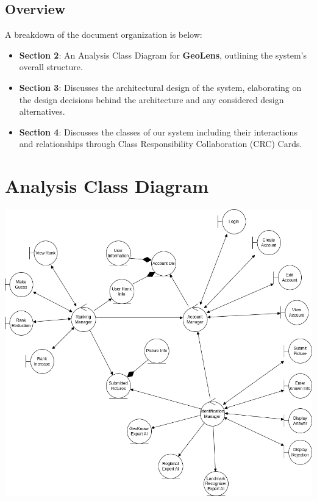 \documentclass[]{article}
\begin{document}
\subsection{Overview}
\label{sub:overview}
A breakdown of the document organization is below:
\begin{itemize}
  \item \textbf{Section 2}: An Analysis Class Diagram for \textbf{GeoLens}, outlining the system’s overall structure.
  \item \textbf{Section 3}: Discusses the architectural design of the system, elaborating on the design decisions behind the architecture and any considered design alternatives.
  \item \textbf{Section 4}: Discusses the classes of our system including their interactions and relationships through Class Responsibility Collaboration (CRC) Cards.
\end{itemize}



\section{Analysis Class Diagram}
\label{sec:analysis_class_diagram}
\includegraphics[scale=0.5]{analysis_class_diagram}
\end{document}
